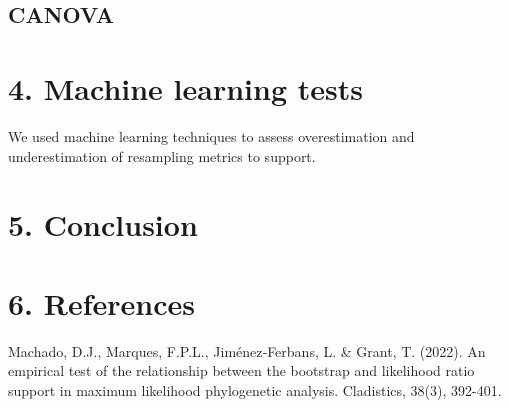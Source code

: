 \documentclass[
]{article}
\begin{document}
\hypertarget{canova}{%
\subsection{CANOVA}\label{canova}}

\hypertarget{machine-learning-tests}{%
\section{4. Machine learning tests}\label{machine-learning-tests}}

We used machine learning techniques to assess overestimation and
underestimation of resampling metrics to support.

\hypertarget{conclusion}{%
\section{5. Conclusion}\label{conclusion}}

\hypertarget{references}{%
\section{6. References}\label{references}}

Machado, D.J., Marques, F.P.L., Jiménez‐Ferbans, L. \& Grant, T. (2022).
An empirical test of the relationship between the bootstrap and
likelihood ratio support in maximum likelihood phylogenetic analysis.
Cladistics, 38(3), 392-401.
\end{document}
